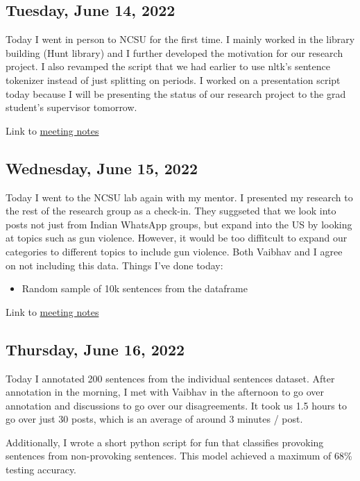 \documentclass[11pt,letterpaper]{article}
\begin{document}
\subsection{Tuesday, June 14, 2022}
Today I went in person to NCSU for the first time. I mainly worked in the library building (Hunt library) and I further developed the motivation for our research project. I also revamped the script that we had earlier to use nltk's sentence tokenizer instead of just splitting on periods. I worked on a presentation script today because I will be presenting the status of our research project to the grad student's supervisor tomorrow.

Link to \href{https://docs.google.com/document/d/1p_nFBoggFyVAgsPvoWxGu3Vn5lqnA7eN9yLNTDxCdVI/edit?usp=sharing}{meeting notes}

\subsection{Wednesday, June 15, 2022}
Today I went to the NCSU lab again with my mentor. I presented my research to the rest of the research group as a check-in. They suggseted that we look into posts not just from Indian WhatsApp groups, but expand into the US by looking at topics such as gun violence. However, it would be too diffitcult to expand our categories to different topics to include gun violence. Both Vaibhav and I agree on not including this data. Things I've done today:

\begin{itemize}
    \item Random sample of 10k sentences from the dataframe
\end{itemize}

Link to \href{https://docs.google.com/document/d/1xcxDhuWBfwrEzA_Y6ZK-tRo33wt-DthB-97ZrMezN8w/edit?usp=sharing}{meeting notes}

\subsection{Thursday, June 16, 2022}
Today I annotated 200 sentences from the individual sentences dataset. After annotation in the morning, I met with Vaibhav in the afternoon to go over annotation and discussions to go over our disagreements. It took us 1.5 hours to go over just 30 posts, which is an average of around 3 minutes / post.

Additionally, I wrote a short python script for fun that classifies provoking sentences from non-provoking sentences. This model achieved a maximum of 68\% testing accuracy.
\end{document}
